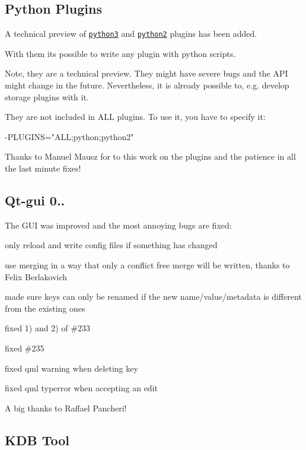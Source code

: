 \subsection*{Python Plugins}

A technical preview of \href{http://git.libelektra.org/blob/master/src/plugins/python}{\tt python3} and \href{http://git.libelektra.org/blob/master/src/plugins/python2}{\tt python2} plugins has been added.

With them its possible to write any plugin with python scripts.

Note, they are a technical preview. They might have severe bugs and the A\+P\+I might change in the future. Nevertheless, it is already possible to, e.\+g. develop storage plugins with it.

They are not included in {\ttfamily A\+L\+L} plugins. To use it, you have to specify it\+: \begin{DoxyVerb}-PLUGINS="ALL;python;python2"
\end{DoxyVerb}


Thanks to Manuel Mausz for to this work on the plugins and the patience in all the last minute fixes!

\subsection*{Qt-\/gui 0..}

The G\+U\+I was improved and the most annoying bugs are fixed\+:


\begin{DoxyItemize}
\item only reload and write config files if something has changed
\item use merging in a way that only a conflict free merge will be written, thanks to Felix Berlakovich
\item made sure keys can only be renamed if the new name/value/metadata is different from the existing ones
\item fixed 1) and 2) of \#233
\item fixed \#235
\item fixed qml warning when deleting key
\item fixed qml typerror when accepting an edit
\end{DoxyItemize}

A big thanks to Raffael Pancheri!

\subsection*{K\+D\+B Tool}


